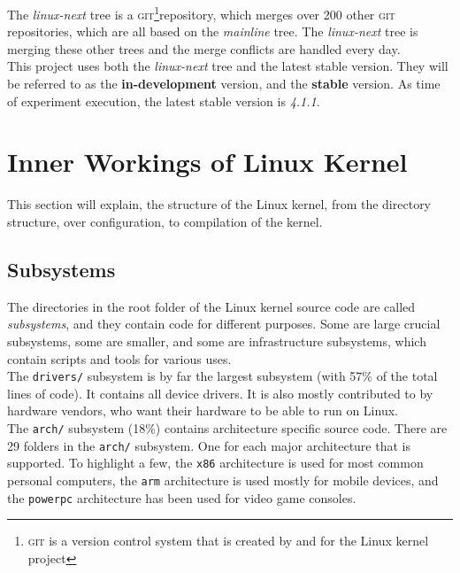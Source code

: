 \documentclass[a4paper,11pt]{report}
\newcommand{\f}{\footnote{\fn}}
\newcommand{\figa}{
    \begin{figure}[!htpb]
    \centering
}
\newcommand{\figb}[2]{
    \caption{#1}
    \label{#2}
    \end{figure}
}
\begin{document}
            \def \fn {\textsc{git} is a version control system that is created
            by and for the Linux kernel project}

The \emph{linux-next} tree is a \textsc{git}\f repository, which merges over 200 
other \textsc{git} repositories\cite {nextTrees}, which are all based on the 
\emph{mainline} tree. The \emph{linux-next} tree is merging these other trees 
and the merge conflicts are handled every day.
\\

This project uses both the \emph{linux-next} tree and the latest stable 
version. They will be referred to as the \textbf{in-development} 
version, and the \textbf{stable} version. As time of experiment execution, the 
latest stable version is \emph{4.1.1}.


    \section{Inner Workings of Linux Kernel}

This section will explain, the structure of the Linux kernel, from the 
directory structure, over configuration, to compilation of the kernel.


            \subsection{Subsystems}
            \label{sec:linuxss}

The directories in the root folder of the Linux kernel source code are called 
\emph{subsystems}, and they contain code for different purposes. Some are large 
crucial subsystems, some are smaller, and some are infrastructure 
subsystems, which contain scripts and tools for various uses\cite{42bugs}.
\\

The \texttt{drivers/} subsystem is by far the largest subsystem (with 57\% of 
the total lines of code). It contains all device drivers. It is also mostly 
contributed to by hardware vendors, who want their hardware to be able to run 
on Linux.
\\

The \texttt{arch/} subsystem (18\%) contains architecture specific source code. 
There are 29 folders in the \texttt{arch/} subsystem. One for each major 
architecture that is supported. To highlight a few, the \texttt{x86} 
architecture is used for most common personal computers, the \texttt{arm} 
architecture is used mostly for mobile devices, and the \texttt{powerpc} 
architecture has been used for video game consoles.
\end{document}
